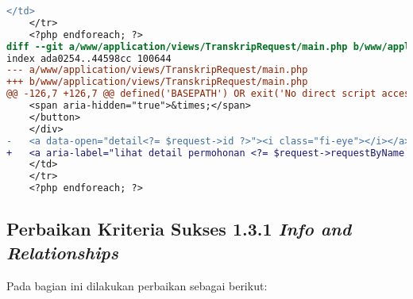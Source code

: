 \begin{lstlisting}[frame=single, label={lst:perbaikan_1.1.1_ikon_tanpa_nama}, language=diff, caption=Perbaikan Kriteria Sukses 1.1.1 - Ikon Tanpa Nama]
    </td>
    </tr>
    <?php endforeach; ?>
diff --git a/www/application/views/TranskripRequest/main.php b/www/application/views/TranskripRequest/main.php
index ada0254..44598cc 100644
--- a/www/application/views/TranskripRequest/main.php
+++ b/www/application/views/TranskripRequest/main.php
@@ -126,7 +126,7 @@ defined('BASEPATH') OR exit('No direct script access allowed');
    <span aria-hidden="true">&times;</span>
    </button>
    </div>
-   <a data-open="detail<?= $request->id ?>"><i class="fi-eye"></i></a>
+   <a aria-label="lihat detail permohonan <?= $request->requestByName ?>" data-open="detail<?= $request->id ?>"><i class="fi-eye"></i></a>
    </td>
    </tr>
    <?php endforeach; ?>
\end{lstlisting}

\subsection{Perbaikan Kriteria Sukses 1.3.1 \textit{Info and Relationships}}
\label{subsec:perbaikan_kriteria_sukses_1.3.1}
Pada bagian ini dilakukan perbaikan sebagai berikut:

